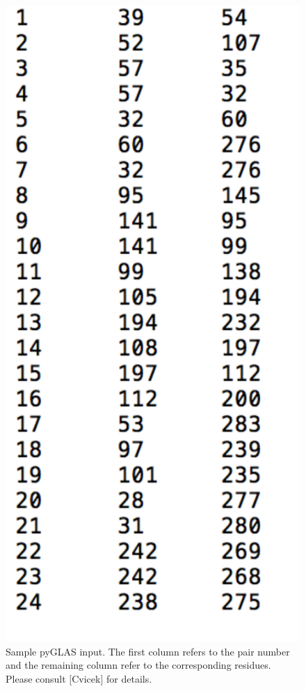 \documentclass[12pt]{article}
\begin{document}
\begin{figure}
	\centering
	\includegraphics[scale=0.2]{pyGLAS_input.png}
	\caption{Sample pyGLAS input. The first column refers to the pair number and the remaining column refer to the corresponding residues. Please consult [Cvicek] for details.}
\end{figure}
\end{document}
